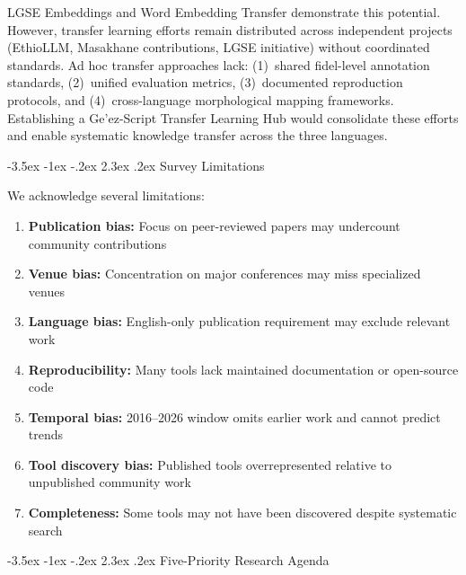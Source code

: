 \documentclass[12pt,a4paper]{article}
\makeatletter
\theoremstyle{plain}
\theoremstyle{definition}
\renewcommand{\section}{\@startsection{section}{1}{\z@}%
  {-3.5ex \@plus -1ex \@minus -.2ex}%
  {2.3ex \@plus.2ex}%
  {\large\bfseries\color{NavyBlue}}}
\makeatother
\begin{document}
LGSE Embeddings and Word Embedding Transfer demonstrate this potential. However, transfer learning efforts remain distributed across independent projects (EthioLLM, Masakhane contributions, LGSE initiative) without coordinated standards. Ad hoc transfer approaches lack: (1)~shared fidel-level annotation standards, (2)~unified evaluation metrics, (3)~documented reproduction protocols, and (4)~cross-language morphological mapping frameworks. Establishing a Ge'ez-Script Transfer Learning Hub would consolidate these efforts and enable systematic knowledge transfer across the three languages.


\section{Survey Limitations}

We acknowledge several limitations:

\begin{enumerate}
    \item \textbf{Publication bias:} Focus on peer-reviewed papers may undercount community contributions
    \item \textbf{Venue bias:} Concentration on major conferences may miss specialized venues
    \item \textbf{Language bias:} English-only publication requirement may exclude relevant work
    \item \textbf{Reproducibility:} Many tools lack maintained documentation or open-source code
    \item \textbf{Temporal bias:} 2016--2026 window omits earlier work and cannot predict trends
    \item \textbf{Tool discovery bias:} Published tools overrepresented relative to unpublished community work
    \item \textbf{Completeness:} Some tools may not have been discovered despite systematic search
\end{enumerate}


\section{Five-Priority Research Agenda}
\end{document}

